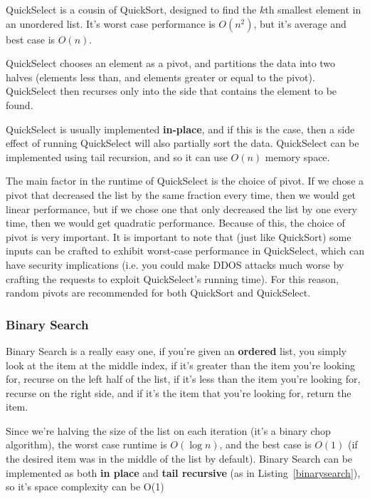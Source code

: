 QuickSelect is a cousin of QuickSort, designed to find the $k$th smallest
element in an unordered list. It's worst case performance is $O(n^2)$, but it's
average and best case is $O(n)$.

QuickSelect chooses an element as a pivot, and partitions the data into two
halves (elements less than, and elements greater or equal to the pivot).
QuickSelect then recurses only into the side that contains the element to be
found.

QuickSelect is usually implemented \textbf{in-place}, and if this is the case,
then a side effect of running QuickSelect will also partially sort the data.
QuickSelect can be implemented using tail recursion, and so it can use $O(n)$
memory space.

The main factor in the runtime of QuickSelect is the choice of pivot. If we
chose a pivot that decreased the list by the same fraction every time, then we
would get linear performance, but if we chose one that only decreased the list
by one every time, then we would get quadratic performance. Because of this, the
choice of pivot is very important. It is important to note that (just like
QuickSort) some inputs can be crafted to exhibit worst-case performance in
QuickSelect, which can have security implications (i.e. you could make DDOS
attacks much worse by crafting the requests to exploit QuickSelect's running
time). For this reason, random pivots are recommended for both QuickSort and
QuickSelect.

\subsubsection{Binary Search}

Binary Search is a really easy one, if you're given an \textbf{ordered} list,
you simply look at the item at the middle index, if it's greater than the item
you're looking for, recurse on the left half of the list, if it's less than the
item you're looking for, recurse on the right side, and if it's the item that
you're looking for, return the item.


Since we're halving the size of the list on each iteration (it's a binary chop
algorithm), the worst case runtime is $O(\log n)$, and the best case is $O(1)$
(if the desired item was in the middle of the list by default). Binary Search
can be implemented as both \textbf{in place} and \textbf{tail recursive} (as in
Listing~\ref{binarysearch}), so it's space complexity can be O(1)

